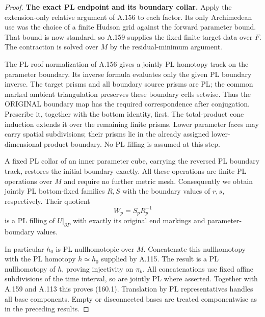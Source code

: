 \begin{proof}
\textbf{The exact PL endpoint and its boundary collar.}\quad
Apply the extension-only relative argument of A.156 to
each factor. Its only Archimedean use was the choice of
a finite Hudson grid against the forward parameter bound.
That bound is now standard, so A.159 supplies the fixed
finite target data over $F$. The contraction is solved
over $M$ by the residual-minimum argument.

The PL roof normalization of A.156 gives a jointly PL
homotopy track on the parameter boundary. Its inverse
formula evaluates only the given PL boundary inverse.
The target prisms and all boundary source prisms are PL;
the common marked ambient triangulation preserves these
boundary cells setwise. Thus the ORIGINAL boundary map
has the required correspondence after conjugation.
Prescribe it, together with the bottom identity, first.
The total-product cone induction extends it over the
remaining finite prisms. Lower parameter faces may carry
spatial subdivisions; their prisms lie in the already
assigned lower-dimensional product boundary. No PL filling
is assumed at this step.

A fixed PL collar of an inner parameter cube, carrying
the reversed PL boundary track, restores the initial
boundary exactly. All these operations are finite PL
operations over $M$ and require no further metric mesh.
Consequently we obtain jointly PL bottom-fixed families
$R,S$ with the boundary values of $r,s$, respectively.
Their quotient
\[
 W_p=S_pR_p^{-1}
 \tag{160.3}
\]
is a PL filling of $U|_{\partial P}$ with exactly its
original end markings and parameter-boundary values.

In particular $h_0$ is PL nullhomotopic over $M$.
Concatenate this nullhomotopy with the PL homotopy
$h\simeq h_0$ supplied by A.115. The result is a PL
nullhomotopy of $h$, proving injectivity on $\pi_k$.
All concatenations use fixed affine subdivisions of the
time interval, so are jointly PL where asserted.
Together with A.159 and A.113 this proves (160.1).
Translation by PL representatives handles all base
components. Empty or disconnected bases are treated
componentwise as in the preceding results.
\end{proof}

